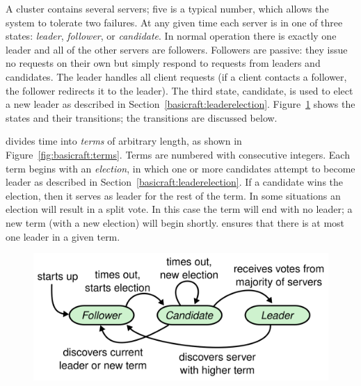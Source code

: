 A \name{} cluster contains several servers; five is a typical
number, which allows the system to tolerate two failures.
At any given time each server is in one of three states: \emph{leader},
\emph{follower}, or \emph{candidate}. In normal operation there is
exactly one leader and all of the other servers are followers. Followers
are passive: they issue no requests on their own but simply
respond to requests from leaders and candidates. The leader handles all
client requests (if a client contacts a
follower, the follower redirects it to the leader).
The third state, candidate, is used to elect a new leader as
described in Section~\ref{basicraft:leaderelection}.
Figure~\ref{fig:basicraft:followercandidateleader} shows the states and
their transitions; the transitions are discussed
below.

\name{} divides time into \emph{terms} of arbitrary length,
as shown in Figure~\ref{fig:basicraft:terms}.
Terms are numbered with consecutive integers. Each term begins with an
\emph{election}, in which one or more candidates attempt to become
leader as described in Section~\ref{basicraft:leaderelection}. If a candidate
wins the election, then it serves as
leader for the rest of the term. In some situations an election will
result in a split vote. In this case the
term will end with no leader; a new term (with a new election)
will begin shortly. \name{} ensures that there is at most one leader
in a given term.
\begin{figure}
\centering
\includegraphics[scale=.50]{basicraft/followercandidateleader}
\label{fig:basicraft:followercandidateleader}
\end{figure}

